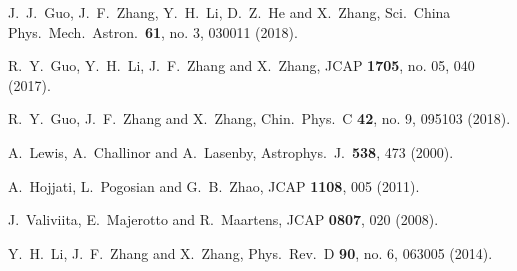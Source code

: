 \documentclass[aps,prd,nofootinbib,amsmath,amssymb,twocolumn,superscriptaddress,10pt]{revtex4}%
\begin{document}
\begin{thebibliography}{}
  J.~J.~Guo, J.~F.~Zhang, Y.~H.~Li, D.~Z.~He and X.~Zhang,
  Sci.\ China Phys.\ Mech.\ Astron.\  {\bf 61}, no. 3, 030011 (2018).








  R.~Y.~Guo, Y.~H.~Li, J.~F.~Zhang and X.~Zhang,
  JCAP {\bf 1705}, no. 05, 040 (2017).

  R.~Y.~Guo, J.~F.~Zhang and X.~Zhang,
  Chin.\ Phys.\ C {\bf 42}, no. 9, 095103 (2018).










  A.~Lewis, A.~Challinor and A.~Lasenby,
  Astrophys.\ J.\  {\bf 538}, 473 (2000).

  A.~Hojjati, L.~Pogosian and G.~B.~Zhao,
  JCAP {\bf 1108}, 005 (2011).

  J.~Valiviita, E.~Majerotto and R.~Maartens,
  JCAP {\bf 0807}, 020 (2008).

  Y.~H.~Li, J.~F.~Zhang and X.~Zhang,
  Phys.\ Rev.\ D {\bf 90}, no. 6, 063005 (2014).


\end{thebibliography}
\end{document}
